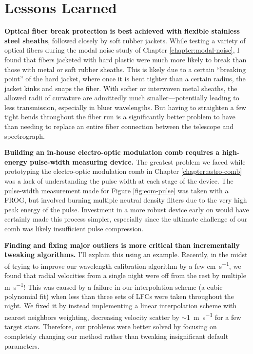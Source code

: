 \section{Lessons Learned} \label{conclusion:lessons}

\textbf{Optical fiber break protection is best achieved with flexible stainless steel sheaths}, followed closely by soft rubber jackets. While testing a variety of optical fibers during the modal noise study of Chapter \ref{chapter:modal-noise}, I found that fibers jacketed with hard plastic were much more likely to break than those with metal or soft rubber sheaths. This is likely due to a certain ``breaking point'' of the hard jacket, where once it is bent tighter than a certain radius, the jacket kinks and snaps the fiber. With softer or interwoven metal sheaths, the allowed radii of curvature are admittedly much smaller---potentially leading to less transmission, especially in bluer wavelengths. But having to straighten a few tight bends throughout the fiber run is a significantly better problem to have than needing to replace an entire fiber connection between the telescope and spectrograph.

\textbf{Building an in-house electro-optic modulation comb requires a high-energy pulse-width measuring device.} The greatest problem we faced while prototyping the electro-optic modulation comb in Chapter \ref{chapter:astro-comb} was a lack of understanding the pulse width at each stage of the device. The pulse-width measurement made for Figure \ref{fig:eom-pulse} was taken with a FROG, but involved burning multiple neutral density filters due to the very high peak energy of the pulse. Investment in a more robust device early on would have certainly made this process simpler, especially since the ultimate challenge of our comb was likely insufficient pulse compression.

\textbf{Finding and fixing major outliers is more critical than incrementally tweaking algorithms.} I'll explain this using an example. Recently, in the midst of trying to improve our wavelength calibration algorithm by a few \si{\centi\meter\per\second}, we found that radial velocities from a single night were off from the rest by multiple \si{\meter\per\second}! This was caused by a failure in our interpolation scheme (a cubic polynomial fit) when less than three sets of LFCs were taken throughout the night. We fixed it by instead implementing a linear interpolation scheme with nearest neighbors weighting, decreasing velocity scatter by $\sim$1~\si{\meter\per\second} for a few target stars. Therefore, our problems were better solved by focusing on completely changing our method rather than tweaking insignificant default parameters.

